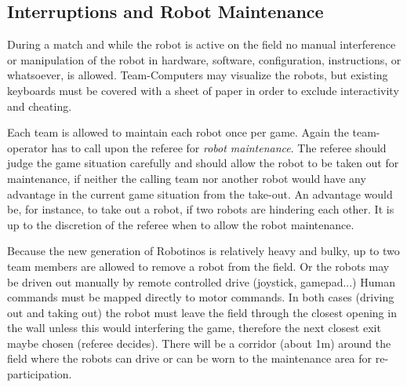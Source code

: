 \documentclass[12pt,twoside]{article}
\begin{document}

\subsection{Interruptions and Robot Maintenance}
\label{sec:robot-maintenance}
During a match and while the robot is active on the field no manual
interference or manipulation of the robot in hardware, software,
configuration, instructions, or whatsoever, is allowed.
Team-Computers may visualize the robots, but existing keyboards must
be covered with a sheet of paper in order to exclude interactivity and
cheating.


Each team is allowed to maintain each robot once per game. Again the
team-operator has to call upon the referee for \textit{robot
  maintenance}.  The referee should judge the game situation carefully
and should allow the robot to be taken out for maintenance, if neither
the calling team nor another robot would have any advantage in the
current game situation from the take-out. An advantage would be, for
instance, to take out a robot, if two robots are hindering each
other. It is up to the discretion of the referee when to allow the
robot maintenance.

Because the new generation of Robotinos is relatively heavy and bulky,
up to two team members are allowed to remove a robot from the field.
Or the robots may be driven out manually by remote controlled drive
(joystick, gamepad...)  Human commands must be mapped directly to
motor commands.  In both cases (driving out and taking out) the robot
must leave the field through the closest opening in the wall unless
this would interfering the game, therefore the next closest exit maybe
chosen (referee decides).  There will be a corridor (about 1m) around
the field where the robots can drive or can be worn to the maintenance
area for re-participation.
\end{document}
